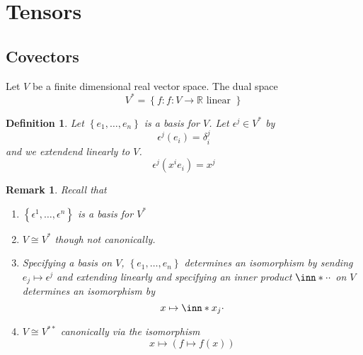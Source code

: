 \documentclass[a4paper]{article}
\newtheorem*{defn}{Definition}
\newtheorem*{rem}{Remark}
\begin{document}
\section*{Tensors}%

\subsection*{Covectors}%
Let $V$ be a finite dimensional real vector space. The dual space 
\[
  V^*  = \left\{ f: f:V \rightarrow \mathds{R} \text{ linear } \right\}
\]
\begin{defn}
  Let $\left\{ e_1, \dots, e_n \right\}$ is a basis for $V$. Let $\epsilon^j \in V^*$ by
  \[
    \epsilon^j(e_i) = \delta_i^j
  \]
  and we extendend linearly to $V$.
  \[
    \epsilon^j(x^ie_i) = x^j
  \]
\end{defn}

\begin{rem}
  Recall that
  \begin{enumerate}
    \item $\left\{ \epsilon^1,  \dots, \epsilon^n \right\}$ is a basis for $V^*$
    \item $V \cong V^*$ though not canonically.
    \item Specifying a basis on $V$, $\left\{e_1, \dots, e_n  \right\}$ determines an isomorphism by sending $e_j \mapsto \epsilon^j$ and extending linearly and specifying an inner product $\inn*{\cdot}{\cdot}$ on $V$ determines an isomorphism by
      \[
        x \mapsto \inn*{x_j}{\cdot}
      \]
    \item $V \cong V^{**}$ canonically via the isomorphism
      \[
        x \mapsto (f \mapsto f(x))
      \]
  \end{enumerate}
\end{rem}
\end{document}
